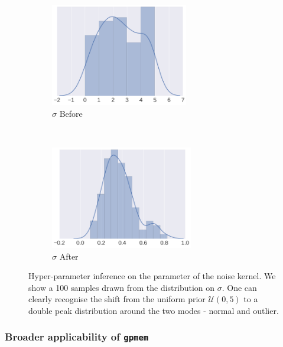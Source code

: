\documentclass{article} %
\newcommand{\gpmem}{\texttt{gpmem}}
\begin{document}
\begin{figure}
        \centering
        \begin{subfigure}[b]{0.5\textwidth} \centering
                \includegraphics[height=4.5cm]{figs/neal_unif_sigma_before_desktop_50_5.png}
                \caption{$\sigma$ Before}
                \label{fig:before}
        \end{subfigure}%
        ~ %
        \begin{subfigure}[b]{0.5\textwidth} \centering
                \includegraphics[height=4.5cm]{figs/neal_unif_sigma_after_ulliDesktop_n503.png}
                \caption{$\sigma$  After}
                \label{fig:after))}
        \end{subfigure}
        \caption{Hyper-parameter inference on the parameter of the noise kernel. We show a 100 samples drawn from the distribution on $\sigma$. One can clearly recognise the shift from the uniform prior $\mathcal{U}(0,5)$ to a double peak distribution around the two modes - normal and outlier.}\label{fig:inference}
\end{figure}

\subsubsection{Broader applicability of \gpmem}\label{sec:gpmem-broader}
\end{document}

